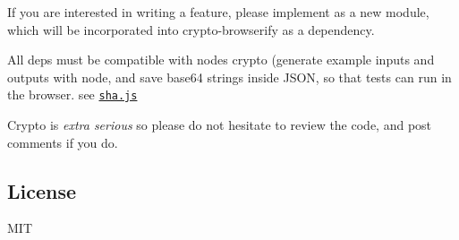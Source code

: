 If you are interested in writing a feature, please implement as a new module, which will be incorporated into crypto-\/browserify as a dependency.

All deps must be compatible with node\textquotesingle{}s crypto (generate example inputs and outputs with node, and save base64 strings inside J\+S\+ON, so that tests can run in the browser. see \href{https://github.com/dominictarr/sha.js}{\tt sha.\+js}

Crypto is {\itshape extra serious} so please do not hesitate to review the code, and post comments if you do.

\subsection*{License}

M\+IT 